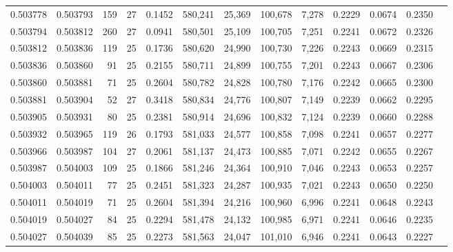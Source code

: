 \begin{tabular}{rrrrrrrrrrrrr}
0.503778 & 0.503793 & 159 &  27 &                                     0.1452 & 580,241 &  25,369 & 100,678 &   7,278 & 0.2229 & 0.0674 & 0.2350 \\
0.503794 & 0.503812 & 260 &  27 &                                     0.0941 & 580,501 &  25,109 & 100,705 &   7,251 & 0.2241 & 0.0672 & 0.2326 \\
0.503812 & 0.503836 & 119 &  25 &                                     0.1736 & 580,620 &  24,990 & 100,730 &   7,226 & 0.2243 & 0.0669 & 0.2315 \\
0.503836 & 0.503860 &  91 &  25 &                                     0.2155 & 580,711 &  24,899 & 100,755 &   7,201 & 0.2243 & 0.0667 & 0.2306 \\
0.503860 & 0.503881 &  71 &  25 &                                     0.2604 & 580,782 &  24,828 & 100,780 &   7,176 & 0.2242 & 0.0665 & 0.2300 \\
0.503881 & 0.503904 &  52 &  27 &                                     0.3418 & 580,834 &  24,776 & 100,807 &   7,149 & 0.2239 & 0.0662 & 0.2295 \\
0.503905 & 0.503931 &  80 &  25 &                                     0.2381 & 580,914 &  24,696 & 100,832 &   7,124 & 0.2239 & 0.0660 & 0.2288 \\
0.503932 & 0.503965 & 119 &  26 &                                     0.1793 & 581,033 &  24,577 & 100,858 &   7,098 & 0.2241 & 0.0657 & 0.2277 \\
0.503966 & 0.503987 & 104 &  27 &                                     0.2061 & 581,137 &  24,473 & 100,885 &   7,071 & 0.2242 & 0.0655 & 0.2267 \\
0.503987 & 0.504003 & 109 &  25 &                                     0.1866 & 581,246 &  24,364 & 100,910 &   7,046 & 0.2243 & 0.0653 & 0.2257 \\
0.504003 & 0.504011 &  77 &  25 &                                     0.2451 & 581,323 &  24,287 & 100,935 &   7,021 & 0.2243 & 0.0650 & 0.2250 \\
0.504011 & 0.504019 &  71 &  25 &                                     0.2604 & 581,394 &  24,216 & 100,960 &   6,996 & 0.2241 & 0.0648 & 0.2243 \\
0.504019 & 0.504027 &  84 &  25 &                                     0.2294 & 581,478 &  24,132 & 100,985 &   6,971 & 0.2241 & 0.0646 & 0.2235 \\
0.504027 & 0.504039 &  85 &  25 &                                     0.2273 & 581,563 &  24,047 & 101,010 &   6,946 & 0.2241 & 0.0643 & 0.2227 \\

\end{tabular}
